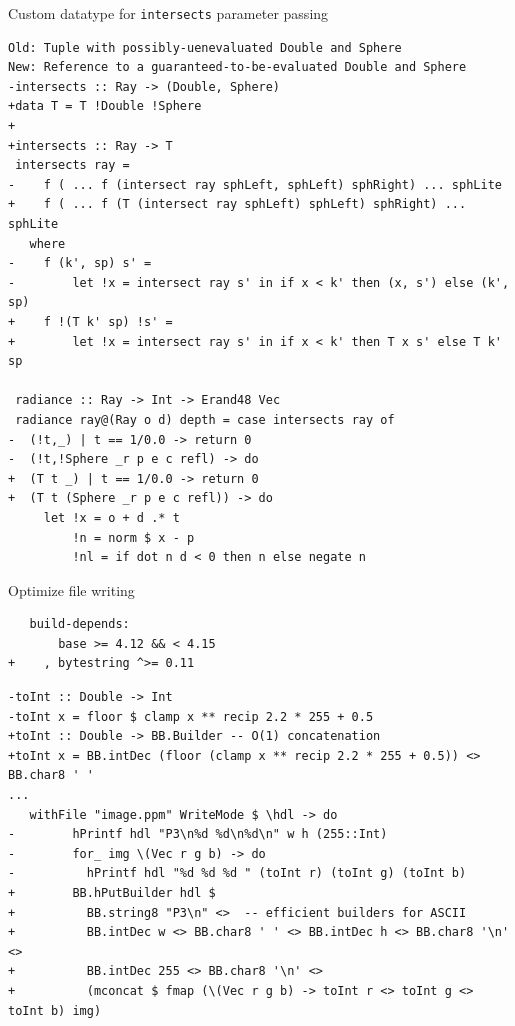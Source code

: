 \documentclass[8pt]{beamer}
\begin{document}
\begin{frame}[fragile]{Custom datatype for \texttt{intersects} parameter passing}
\begin{verbatim}
Old: Tuple with possibly-uenevaluated Double and Sphere
New: Reference to a guaranteed-to-be-evaluated Double and Sphere
-intersects :: Ray -> (Double, Sphere)
+data T = T !Double !Sphere 
+
+intersects :: Ray -> T
 intersects ray =
-    f ( ... f (intersect ray sphLeft, sphLeft) sphRight) ... sphLite
+    f ( ... f (T (intersect ray sphLeft) sphLeft) sphRight) ... sphLite
   where
-    f (k', sp) s' = 
-        let !x = intersect ray s' in if x < k' then (x, s') else (k', sp)
+    f !(T k' sp) !s' =
+        let !x = intersect ray s' in if x < k' then T x s' else T k' sp
 
 radiance :: Ray -> Int -> Erand48 Vec
 radiance ray@(Ray o d) depth = case intersects ray of
-  (!t,_) | t == 1/0.0 -> return 0
-  (!t,!Sphere _r p e c refl) -> do
+  (T t _) | t == 1/0.0 -> return 0
+  (T t (Sphere _r p e c refl)) -> do
     let !x = o + d .* t
         !n = norm $ x - p
         !nl = if dot n d < 0 then n else negate n
\end{verbatim}


\end{frame}

\begin{frame}[fragile]{Optimize file writing}
\begin{verbatim}
   build-depends:
       base >= 4.12 && < 4.15
+    , bytestring ^>= 0.11
\end{verbatim}
\begin{verbatim}
-toInt :: Double -> Int
-toInt x = floor $ clamp x ** recip 2.2 * 255 + 0.5
+toInt :: Double -> BB.Builder -- O(1) concatenation
+toInt x = BB.intDec (floor (clamp x ** recip 2.2 * 255 + 0.5)) <> BB.char8 ' '
... 
   withFile "image.ppm" WriteMode $ \hdl -> do
-        hPrintf hdl "P3\n%d %d\n%d\n" w h (255::Int)
-        for_ img \(Vec r g b) -> do
-          hPrintf hdl "%d %d %d " (toInt r) (toInt g) (toInt b)
+        BB.hPutBuilder hdl $
+          BB.string8 "P3\n" <>  -- efficient builders for ASCII
+          BB.intDec w <> BB.char8 ' ' <> BB.intDec h <> BB.char8 '\n' <>
+          BB.intDec 255 <> BB.char8 '\n' <>
+          (mconcat $ fmap (\(Vec r g b) -> toInt r <> toInt g <> toInt b) img)
\end{verbatim}


\end{frame}
\end{document}
